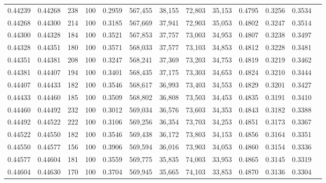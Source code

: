 \begin{tabular}{rrrrrrrrrrrrr}
0.44239 & 0.44268 &    238 & 100 &                                     0.2959 & 567,455 &  38,155 &  72,803 &  35,153 & 0.4795 & 0.3256 & 0.3534 \\
0.44268 & 0.44300 &    214 & 100 &                                     0.3185 & 567,669 &  37,941 &  72,903 &  35,053 & 0.4802 & 0.3247 & 0.3514 \\
0.44300 & 0.44328 &    184 & 100 &                                     0.3521 & 567,853 &  37,757 &  73,003 &  34,953 & 0.4807 & 0.3238 & 0.3497 \\
0.44328 & 0.44351 &    180 & 100 &                                     0.3571 & 568,033 &  37,577 &  73,103 &  34,853 & 0.4812 & 0.3228 & 0.3481 \\
0.44351 & 0.44381 &    208 & 100 &                                     0.3247 & 568,241 &  37,369 &  73,203 &  34,753 & 0.4819 & 0.3219 & 0.3462 \\
0.44381 & 0.44407 &    194 & 100 &                                     0.3401 & 568,435 &  37,175 &  73,303 &  34,653 & 0.4824 & 0.3210 & 0.3444 \\
0.44407 & 0.44433 &    182 & 100 &                                     0.3546 & 568,617 &  36,993 &  73,403 &  34,553 & 0.4829 & 0.3201 & 0.3427 \\
0.44433 & 0.44460 &    185 & 100 &                                     0.3509 & 568,802 &  36,808 &  73,503 &  34,453 & 0.4835 & 0.3191 & 0.3410 \\
0.44460 & 0.44492 &    232 & 100 &                                     0.3012 & 569,034 &  36,576 &  73,603 &  34,353 & 0.4843 & 0.3182 & 0.3388 \\
0.44492 & 0.44522 &    222 & 100 &                                     0.3106 & 569,256 &  36,354 &  73,703 &  34,253 & 0.4851 & 0.3173 & 0.3367 \\
0.44522 & 0.44550 &    182 & 100 &                                     0.3546 & 569,438 &  36,172 &  73,803 &  34,153 & 0.4856 & 0.3164 & 0.3351 \\
0.44550 & 0.44577 &    156 & 100 &                                     0.3906 & 569,594 &  36,016 &  73,903 &  34,053 & 0.4860 & 0.3154 & 0.3336 \\
0.44577 & 0.44604 &    181 & 100 &                                     0.3559 & 569,775 &  35,835 &  74,003 &  33,953 & 0.4865 & 0.3145 & 0.3319 \\
0.44604 & 0.44630 &    170 & 100 &                                     0.3704 & 569,945 &  35,665 &  74,103 &  33,853 & 0.4870 & 0.3136 & 0.3304 \\

\end{tabular}
